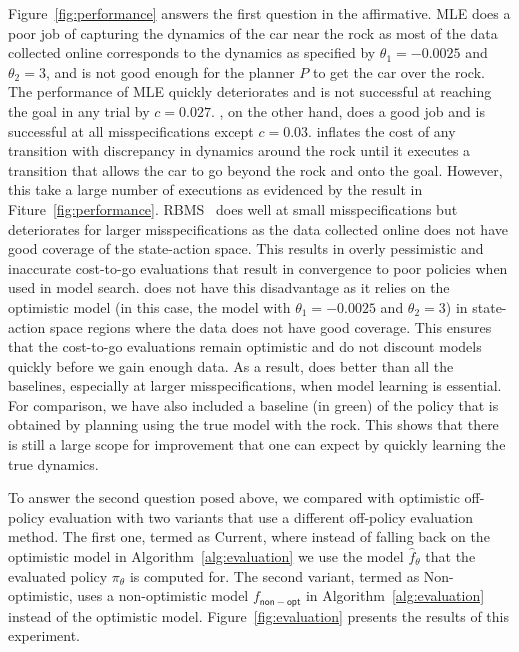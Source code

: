 Figure~\ref{fig:performance} answers the first question in the
affirmative. MLE does a poor job of capturing the dynamics of the car
near the rock as most of the data collected online corresponds to the
dynamics as specified by $\theta_1 = -0.0025$ and $\theta_2 = 3$, and
is not good enough for the planner $P$ to get the car over the
rock. The performance of MLE quickly deteriorates and is not
successful at reaching the goal in any trial by $c = 0.027$. \cmax{},
on the other hand, does a good job and is successful at all
misspecifications except $c = 0.03$. \cmax{} inflates the cost of any
transition with discrepancy in dynamics around the rock until it
executes a transition that allows the car to go beyond the rock and
onto the goal. However, this take a large number of executions as
evidenced by the result in
Fiture~\ref{fig:performance}. RBMS~\cite{DBLP:conf/icra/JosephGRHR13}
does well at small misspecifications but deteriorates for larger
misspecifications as the data collected online does not have good
coverage of the state-action space. This results in overly pessimistic
and inaccurate cost-to-go evaluations that result in convergence to
poor policies when used in model search. \taml{} does not have this
disadvantage as it relies on the optimistic model (in this case, the
model with $\theta_1 = -0.0025$ and $\theta_2 = 3$) in state-action
space regions where the data does not have good coverage. This ensures
that the cost-to-go evaluations remain optimistic and do not discount
models quickly before we gain enough data. As a result, \taml{} does
better than all the baselines, especially at larger misspecifications,
when model learning is essential. For comparison, we have also
included a baseline (in green) of the policy that is obtained by
planning using the true model with the rock. This shows that there is
still a large scope for improvement that one can expect by quickly
learning the true dynamics.

To answer the second question posed above, we compared \taml{} with
optimistic off-policy evaluation with two variants that use a
different off-policy evaluation method. The first one, termed as
\taml{} Current, where instead of falling back on the optimistic model
in Algorithm~\ref{alg:evaluation} we use the model $\hat{f}_\theta$
that the evaluated policy $\pi_\theta$ is computed for. The second
variant, termed as \taml{} Non-optimistic, uses a non-optimistic model
$f_{\mathsf{non-opt}}$ in Algorithm~\ref{alg:evaluation} instead of the
optimistic model. Figure~\ref{fig:evaluation} presents the results of
this experiment.

